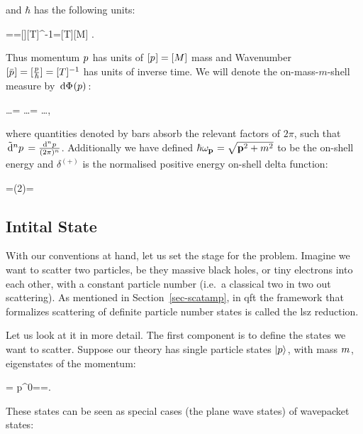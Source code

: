 \documentclass[
  10pt,
  a4paper,
  DIV=11,
  numbers=noendperiod,
  oneside]{scrreprt}
\let\[\relax \let\]\relax %
\DeclareRobustCommand{\[}{\begin{equation}}
\DeclareRobustCommand{\]}{\end{equation}}
\begin{document}
and \(\hbar\) has the following units:

\[
\energy=\hbar \omega\implies [M]=[\hbar][T]^{-1}\implies [\hbar]=[T][M]
.\]

Thus momentum \(\emom\) has units of \([\emom]=[M]\) mass and Wavenumber
\([\bar{\emom}]=[\frac{\emom}{\hbar}]=[T]^{-1}\) has units of inverse
time. We will denote the on-mass-\(m\)-shell measure by
\(\ddP{p}\):

\[
\int {} \dots      = \int {} \dots = \int {} \dots,
\]

where quantities denoted by bars absorb the relevant factors of
\(2\pi\), such that \(\dn[n]{p}=\frac{\dd[n]p}{(2\pi)^n}\). Additionally
we have defined \(\hbar\shellen=\sqrt{\tv{p}^2+m^2}\) to be the on-shell
energy and \(\delta^{(+)}\) is the normalised positive energy on-shell
delta function:

\[
=(2\pi)=
\]

\hypertarget{intital-state}{%
\subsection{Intital State}\label{intital-state}}

With our conventions at hand, let us set the stage for the problem.
Imagine we want to scatter two particles, be they massive black holes,
or tiny electrons into each other, with a constant particle number
(i.e.~a classical two in two out scattering). As mentioned in
Section~\ref{sec-scatamp}, in \gls{qft} the framework that formalizes
scattering of definite particle number states is called the \gls{lsz}
reduction.

{}

Let us look at it in more detail. The first component is to define the
states we want to scatter. Suppose our theory has single particle states
\(\momket\), with mass \(\mass\), eigenstates of the momentum:

\[\ct{\momop}\momket=\ct{\emom}\momket \quad {} \quad p^0=\hbar\shellen=.\]

These states can be seen as special cases (the plane wave states) of
wavepacket states:
\end{document}
